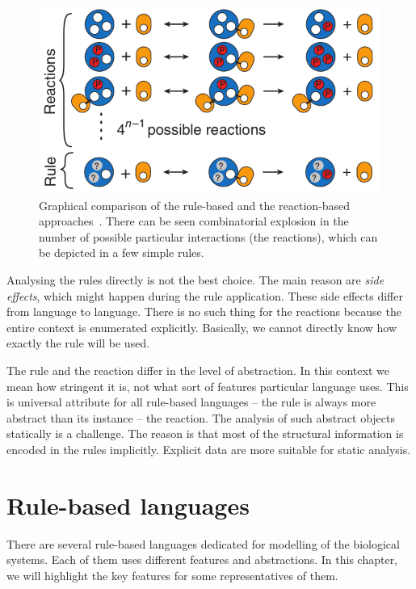 \documentclass[12pt, twoside]{fithesis2} %
\begin{document}
\begin{figure}[!h]
\begin{center}
\includegraphics[scale=0.5]{pics/reaction_vs_rule}
\end{center}
\caption{Graphical comparison of the rule-based and the reaction-based approaches~\cite{sneddon2011efficient}. There can be seen combinatorial explosion in the number of possible particular interactions (the reactions), which can be depicted in a few simple rules.}\label{reaction_vs_rule}
\end{figure}

Analysing the rules directly is not the best choice. The main reason are \emph{side effects}, which might happen during the rule application. These side effects differ from language to language. There is no such thing for the reactions because the entire context is enumerated explicitly. Basically, we cannot directly know how exactly the rule will be used.

The rule and the reaction differ in the level of abstraction. In this context we mean how stringent it is, not what sort of features particular language uses. This is universal attribute for all rule-based languages -- the rule is always more abstract than its instance -- the reaction. The analysis of such abstract objects statically is a challenge. The reason is that most of the structural information is encoded in the rules implicitly. Explicit data are more suitable for static analysis.

\section{Rule-based languages}
\label{rule_based_languages}

There are several rule-based languages dedicated for modelling of the biological systems. Each of them uses different features and abstractions. In this chapter, we will highlight the key features for some representatives of them.
\end{document}
